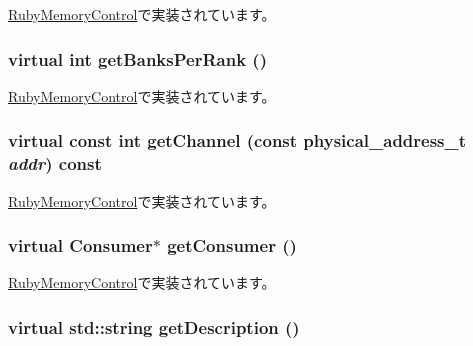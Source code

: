 \hyperlink{classRubyMemoryControl_a26f571eb9a81a077295b54c2ed398aea}{RubyMemoryControl}で実装されています。\hypertarget{classMemoryControl_a931e1da3d57d22fd7f4ba3583697c336}{
\subsubsection[{getBanksPerRank}]{\setlength{\rightskip}{0pt plus 5cm}virtual int getBanksPerRank ()}}
\label{classMemoryControl_a931e1da3d57d22fd7f4ba3583697c336}


\hyperlink{classRubyMemoryControl_aba6f6d5c066193ae70ee43153051055b}{RubyMemoryControl}で実装されています。\hypertarget{classMemoryControl_a439a91ae6f587e18a500ba947d0728d5}{
\subsubsection[{getChannel}]{\setlength{\rightskip}{0pt plus 5cm}virtual const int getChannel (const {\bf physical\_\-address\_\-t} {\em addr}) const}}
\label{classMemoryControl_a439a91ae6f587e18a500ba947d0728d5}


\hyperlink{classRubyMemoryControl_a08f255b8eb3b262916a47fa8f7c12e63}{RubyMemoryControl}で実装されています。\hypertarget{classMemoryControl_acb101bbbf38f858442ec618e9705d039}{
\subsubsection[{getConsumer}]{\setlength{\rightskip}{0pt plus 5cm}virtual {\bf Consumer}$\ast$ getConsumer ()}}
\label{classMemoryControl_acb101bbbf38f858442ec618e9705d039}


\hyperlink{classRubyMemoryControl_a2417fc7252a612b5c976ceaa2d1be4f7}{RubyMemoryControl}で実装されています。\hypertarget{classMemoryControl_a907d681c378517c972b738f4286c25c5}{
\subsubsection[{getDescription}]{\setlength{\rightskip}{0pt plus 5cm}virtual std::string getDescription ()}}
\label{classMemoryControl_a907d681c378517c972b738f4286c25c5}


